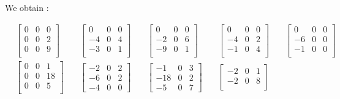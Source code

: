 \documentclass{article}
\begin{document}
	We obtain : 
	
		\[
		\begin{aligned}
			&\begin{bmatrix}
				0 & 0 & 0 \\
				0 & 0 & 2 \\
				0 & 0 & 9 \\
			\end{bmatrix}
			\quad
			&\begin{bmatrix}
				 0 & 0 & 0 \\
				-4 & 0 & 4 \\
				-3 & 0 & 1 \\
			\end{bmatrix}
			\quad
			&\begin{bmatrix}
				 0 & 0 & 0 \\
				-2 & 0 & 6 \\
				-9 & 0 & 1 \\
			\end{bmatrix}
			\quad
			&\begin{bmatrix}
				 0 & 0 & 0 \\
				-4 & 0 & 2 \\
				-1 & 0 & 4 \\
			\end{bmatrix}
			\quad
			&\begin{bmatrix}
			 	 0 & 0 & 0 \\
				-6 & 0 & 0 \\
				-1 & 0 & 0 \\
			\end{bmatrix}
			\\
			&\begin{bmatrix}
				0 & 0 & 1 \\
				0 & 0 & 18 \\
				0 & 0 & 5 \\
			\end{bmatrix}
			\quad
			&\begin{bmatrix}
				-2 & 0 & 2 \\
				-6 & 0 & 2 \\
				-4 & 0 & 0
			\end{bmatrix}
			\quad
			&\begin{bmatrix}
				 -1 & 0 & 3\\
				-18 & 0 & 2\\
			 	 -5 & 0 & 7
			\end{bmatrix}
			\quad
			&\begin{bmatrix}
				-2 & 0 & 1\\
				-2 & 0 & 8\\

\end{bmatrix}
\end{aligned}\]
\end{document}
